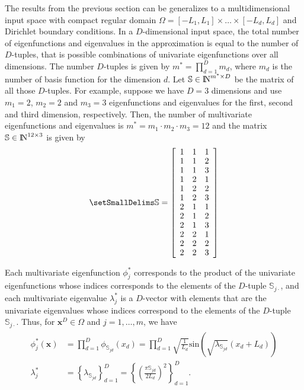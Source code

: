 \documentclass[]{interact}
\theoremstyle{plain}%
\theoremstyle{definition}
\theoremstyle{remark}
\begin{document}
The results from the previous section can be generalizes to a multidimensional input space with compact regular domain $\Omega=[-L_1,L_1] \times \dots \times [-L_d,L_d]$ and Dirichlet boundary conditions. 
In a $D$-dimensional input space, the total number of eigenfunctions and eigenvalues in the approximation is equal to the number of $D$-tuples, that is possible combinations of univariate eigenfunctions over all dimensions. The number $D$-tuples is given by $m^{\ast} = \prod_{d=1}^{D} m_d$, where $m_d$ is the number of basis function for the dimension $d$. Let $\mathbb{S}\in {\rm I\!N}^{m^{\ast} \times D}$ be the matrix of all those $D$-tuples. For example, suppose we have $D=3$ dimensions and use $m_{1}=2$, $m_{2}=2$ and $m_{3}=3$ eigenfunctions and eigenvalues for the first, second and third dimension, respectively. Then, the number of multivariate eigenfunctions and eigenvalues is $m^{\ast} = m_{1} \cdot m_{2} \cdot m_{3} = 12$ and the matrix $\mathbb{S}\in {\rm I\!N}^{12 \times 3}$ is given by
\begin{align}\small
\mathbb{S}=
\left[ {\begin{array}{ccc}
1 & 1 & 1 \nonumber \\
1 & 1 & 2 \\
1 & 1 & 3 \\
1 & 2 & 1 \\
1 & 2 & 2 \\
1 & 2 & 3 \\
2 & 1 & 1 \\
2 & 1 & 2 \\
2 & 1 & 3 \\
2 & 2 & 1 \\
2 & 2 & 2 \\
2 & 2 & 3 
\end{array} } \right]
\end{align} 

Each multivariate eigenfunction $\phi^{\ast}_j$ corresponds to the product of the univariate eigenfunctions whose indices corresponds to the elements of the $D$-tuple $\mathbb{S}_{j\cdotp}$, and each multivariate eigenvalue $\lambda^{\ast}_j$ is a $D$-vector with elements that are the univariate eigenvalues whose indices correspond to the elements of the $D$-tuple $\mathbb{S}_{j\cdotp}$. Thus, for $\mathbf{x}^D \in \Omega$ and $j=1,\ldots,m$, we have 
%
\begin{align} \label{bf&lambda_multi}
\begin{split}
\phi^{\ast}_j(\mathbf{x}) &= \prod_{d=1}^{D} \phi_{\mathbb{S}_{jd}}(x_d) = \prod_{d=1}^{D} \sqrt{\frac{1}{L_d}} \text{sin}\left(\sqrt{\lambda_{\mathbb{S}_{jd}}}(x_d+L_d)\right) \\
%
\lambda^{\ast}_j &= \left\{ \lambda_{\mathbb{S}_{jd}} \right\}_{d=1}^D =  \left\{ \left(\tfrac{\pi \mathbb{S}_{jd}}{2L_d}\right)^2 \right\}_{d=1}^D. 
\end{split}
\end{align}
\end{document}
